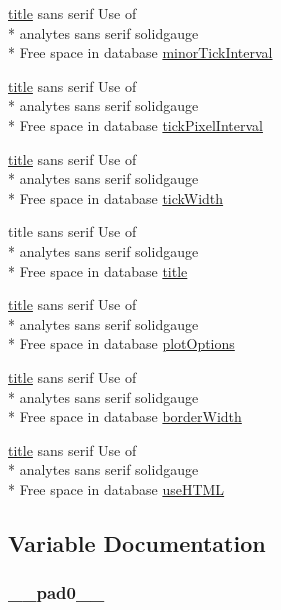 \begin{DoxyCompactItemize}
\item 
\hyperlink{chart1_8php_a256dc75681c13d8a64135187612ba0ee}{title} sans serif Use of \\*
analytes sans serif solidgauge \\*
Free space in database \hyperlink{chart1_8php_a9ffce19cd915b312ed0f797751927ae6}{minor\-Tick\-Interval}
\item 
\hyperlink{chart1_8php_a256dc75681c13d8a64135187612ba0ee}{title} sans serif Use of \\*
analytes sans serif solidgauge \\*
Free space in database \hyperlink{chart1_8php_a024b1caef992f256398e4b6cc5b5d8ae}{tick\-Pixel\-Interval}
\item 
\hyperlink{chart1_8php_a256dc75681c13d8a64135187612ba0ee}{title} sans serif Use of \\*
analytes sans serif solidgauge \\*
Free space in database \hyperlink{chart1_8php_a7888761877a53c44c36fba3a36a0386c}{tick\-Width}
\item 
title sans serif Use of \\*
analytes sans serif solidgauge \\*
Free space in database \hyperlink{chart1_8php_a256dc75681c13d8a64135187612ba0ee}{title}
\item 
\hyperlink{chart1_8php_a256dc75681c13d8a64135187612ba0ee}{title} sans serif Use of \\*
analytes sans serif solidgauge \\*
Free space in database \hyperlink{chart1_8php_ad1521bbfde0c907436d0e34e1deecca2}{plot\-Options}
\item 
\hyperlink{chart1_8php_a256dc75681c13d8a64135187612ba0ee}{title} sans serif Use of \\*
analytes sans serif solidgauge \\*
Free space in database \hyperlink{chart1_8php_a5abb4048aa2be521da8031dbab475850}{border\-Width}
\item 
\hyperlink{chart1_8php_a256dc75681c13d8a64135187612ba0ee}{title} sans serif Use of \\*
analytes sans serif solidgauge \\*
Free space in database \hyperlink{chart1_8php_af4a7422c75cb1e9ea64434c72d9ad6cb}{use\-H\-T\-M\-L}
\end{DoxyCompactItemize}


\subsection{Variable Documentation}
\hypertarget{chart1_8php_aa6d173daeb1f78a82e89d75a4e948f24}{
\subsubsection[{\-\_\-\-\_\-pad0\-\_\-\-\_\-}]{ \-\_\-\-\_\-pad0\-\_\-\-\_\-}}\label{chart1_8php_aa6d173daeb1f78a82e89d75a4e948f24}


